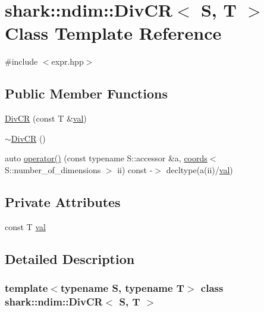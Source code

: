 \hypertarget{classshark_1_1ndim_1_1_div_c_r}{}\section{shark\+:\+:ndim\+:\+:Div\+CR$<$ S, T $>$ Class Template Reference}
\label{classshark_1_1ndim_1_1_div_c_r}


{\ttfamily \#include $<$expr.\+hpp$>$}

\subsection*{Public Member Functions}
\begin{DoxyCompactItemize}
\item 
\hyperlink{classshark_1_1ndim_1_1_div_c_r_a69c14aeea0d6358da98c2a162fdd6415}{Div\+CR} (const T \&\hyperlink{classshark_1_1ndim_1_1_div_c_r_ac37f8f30a7315b8f98e3d29bf59f2529}{val})
\item 
\hyperlink{classshark_1_1ndim_1_1_div_c_r_a1852e78a767faa136774cf9909226f6f}{$\sim$\+Div\+CR} ()
\item 
auto \hyperlink{classshark_1_1ndim_1_1_div_c_r_af8f393a47d5d06cf1df122ab84741852}{operator()} (const typename S\+::accessor \&a, \hyperlink{structshark_1_1ndim_1_1coords}{coords}$<$ S\+::number\+\_\+of\+\_\+dimensions $>$ ii) const -\/$>$ decltype(a(ii)/\hyperlink{classshark_1_1ndim_1_1_div_c_r_ac37f8f30a7315b8f98e3d29bf59f2529}{val})
\end{DoxyCompactItemize}
\subsection*{Private Attributes}
\begin{DoxyCompactItemize}
\item 
const T \hyperlink{classshark_1_1ndim_1_1_div_c_r_ac37f8f30a7315b8f98e3d29bf59f2529}{val}
\end{DoxyCompactItemize}


\subsection{Detailed Description}
\subsubsection*{template$<$typename S, typename T$>$\newline
class shark\+::ndim\+::\+Div\+C\+R$<$ S, T $>$}



